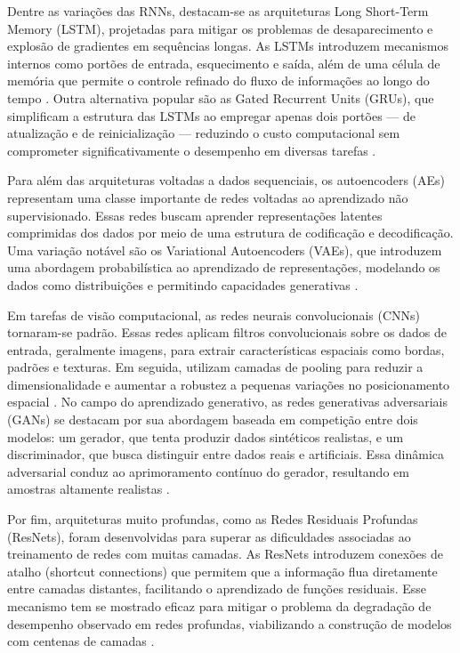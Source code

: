 Dentre as variações das RNNs, destacam-se as arquiteturas Long Short-Term Memory (LSTM), projetadas para mitigar os problemas de desaparecimento e explosão de gradientes em sequências longas. As LSTMs introduzem mecanismos internos como portões de entrada, esquecimento e saída, além de uma célula de memória que permite o controle refinado do fluxo de informações ao longo do tempo . Outra alternativa popular são as Gated Recurrent Units (GRUs), que simplificam a estrutura das LSTMs ao empregar apenas dois portões — de atualização e de reinicialização — reduzindo o custo computacional sem comprometer significativamente o desempenho em diversas tarefas .

Para além das arquiteturas voltadas a dados sequenciais, os autoencoders (AEs) representam uma classe importante de redes voltadas ao aprendizado não supervisionado. Essas redes buscam aprender representações latentes comprimidas dos dados por meio de uma estrutura de codificação e decodificação. Uma variação notável são os Variational Autoencoders (VAEs), que introduzem uma abordagem probabilística ao aprendizado de representações, modelando os dados como distribuições e permitindo capacidades generativas .

Em tarefas de visão computacional, as redes neurais convolucionais (CNNs) tornaram-se padrão. Essas redes aplicam filtros convolucionais sobre os dados de entrada, geralmente imagens, para extrair características espaciais como bordas, padrões e texturas. Em seguida, utilizam camadas de pooling para reduzir a dimensionalidade e aumentar a robustez a pequenas variações no posicionamento espacial . No campo do aprendizado generativo, as redes generativas adversariais (GANs) se destacam por sua abordagem baseada em competição entre dois modelos: um gerador, que tenta produzir dados sintéticos realistas, e um discriminador, que busca distinguir entre dados reais e artificiais. Essa dinâmica adversarial conduz ao aprimoramento contínuo do gerador, resultando em amostras altamente realistas .

Por fim, arquiteturas muito profundas, como as Redes Residuais Profundas (ResNets), foram desenvolvidas para superar as dificuldades associadas ao treinamento de redes com muitas camadas. As ResNets introduzem conexões de atalho (shortcut connections) que permitem que a informação flua diretamente entre camadas distantes, facilitando o aprendizado de funções residuais. Esse mecanismo tem se mostrado eficaz para mitigar o problema da degradação de desempenho observado em redes profundas, viabilizando a construção de modelos com centenas de camadas .

